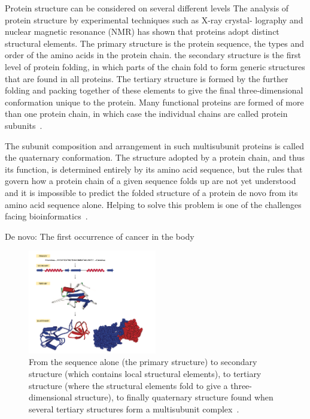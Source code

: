 \documentclass{report}
\begin{document}
Protein structure can be considered on several different levels
The analysis of protein structure by experimental techniques such as X-ray crystal- lography and nuclear magnetic resonance (NMR) has shown that proteins adopt distinct structural elements. The primary structure is the protein sequence, the types and order of the amino acids in the protein chain. the secondary structure is the first level of protein folding, in which parts of the chain fold to form generic structures that are found in all proteins. The tertiary structure is formed by the further folding and packing together of these elements to give the final three-dimensional conformation unique to the protein. Many functional proteins are formed of more than one protein chain, in which case the individual chains are called protein subunits~\cite{zvelebil_understanding_2008}. 

The subunit composition and arrangement in such multisubunit proteins is called the quaternary conformation. The structure adopted by a protein chain, and thus its function, is determined entirely by its amino acid sequence, but the rules that govern how a protein chain of a given sequence folds up are not yet understood and it is impossible to predict the folded structure of a protein de novo from its amino acid sequence alone. Helping to solve this problem is one of the challenges facing bioinformatics~\cite{zvelebil_understanding_2008}.

De novo: The first occurrence of cancer in the body

\begin{figure}
    \centering
    \includegraphics[width=0.5\textwidth]{Protein Structure.png}
    \caption{\label{fig:Simple schematic showing the different levels of protein structure.}From the sequence alone (the primary structure) to secondary structure (which contains local structural elements), to tertiary structure (where the structural elements fold to give a three-dimensional structure), to finally quaternary structure found when several tertiary structures form a multisubunit complex~\cite{zvelebil_understanding_2008}.}
\end{figure}
\end{document}
